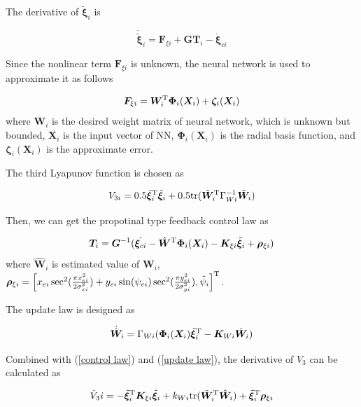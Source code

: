 \documentclass[english]{cccconf}
\begin{document}
The derivative of $\tilde{\bm{\xi}}_i$ is

\begin{equation}
	\dot{\tilde{\bm{\xi}}}_i=\bm{F}_{\xi i}+\bm{G}\bm{T}_i-\dot{\bm{\xi}}_{ci}
\end{equation}

Since the nonlinear term $\bm{F}_{\xi i}$ is unknown, the neural network is used to approximate it as follows

\begin{equation}
	\bm{F}_{\xi i}=\bm{W}^{\rm T}_i\bm{\Phi}_i(\bm{X}_i)+\bm{\zeta}_i(\bm{X}_i)
\end{equation}
where $\bm{W}_i$ is the desired weight matrix of neural network, which is unknown but bounded, $\bm{X}_i$ is the input vector of NN, $\bm{\Phi}_i(\bm{X}_i)$ is the radial basis function, and $\bm{\zeta}_i(\bm{X}_i)$ is the approximate error.  

The third Lyapunov function is chosen as

\begin{equation}
	V_{3i}=0.5\tilde{\bm{\xi}}^{\rm T}_i\tilde{\bm{\xi}}_i+0.5{\rm tr}(\tilde{\bm{W}}^{\rm T}_i\Gamma^{-1}_{Wi}\tilde{\bm{W}}_i)
\end{equation}

Then, we can get the propotinal type feedback control law as

\begin{equation}\label{control law}
	\bm{T}_i=\bm{G}^{-1}(\dot{\bm{\xi}_{ci}}-\hat{\bm{W}}^{\rm T}\bm{\Phi}_i(\bm{X}_i)-\bm{K}_{\xi i}\tilde{\bm{\xi}}_i+\bm{\rho}_{\xi i})
\end{equation}
where $\hat{\bm{W}}_i$ is estimated value of $\bm{W}_i$, $\bm{\rho}_{\xi i}=\left[x_{ei}\sec^2(\frac{\pi x^2_{ei}}{2\sigma^2_{xi}})+y_{ei}\sin(\psi_{ei})\sec^2(\frac{\pi y^2_{ei}}{2\sigma^2_{yi}}),\tilde{\psi}_i\right]^{\rm T}$.

The update law is designed as

\begin{equation}\label{update law}
	\dot{\hat{\bm{W}}}_i=\Gamma_{Wi}(\bm{\Phi}_i(\bm{X}_i)\tilde{\bm{\xi}}^{\rm T}_i-\bm{K}_{Wi}\hat{\bm{W}}_i)
\end{equation}

Combined with (\ref{control law}) and (\ref{update law}), the derivative of $V_3$ can be calculated as

\begin{equation}\label{V3dot}
	\dot{V}_3i=-\tilde{\bm{\xi}}^{\rm T}_i\bm{K}_{\xi i}\tilde{\bm{\xi}}_i+k_{Wi}{\rm tr}(\tilde{\bm{W}}^{\rm T}_i\hat{\bm{W}}_i)+\tilde{\bm{\xi}}^{\rm T}_i\bm{\rho}_{\xi i}
\end{equation}
\end{document}
